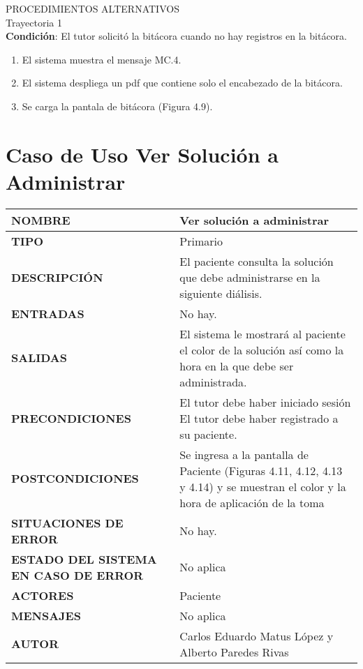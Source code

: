 \newpage
\Large{PROCEDIMIENTOS ALTERNATIVOS}\\
\large{Trayectoria 1}\\
\textbf{Condición}: El tutor solicitó la bitácora cuando no hay registros en la bitácora.
\begin{enumerate}
\item El sistema muestra el mensaje MC.4.
\item El sistema despliega un pdf que contiene solo el encabezado de la bitácora.
\item Se carga la pantala de bitácora (Figura 4.9).
\end{enumerate}
\newpage
\section{Caso de Uso Ver Solución a Administrar}
\begin{longtable}{ | p{6cm} | p{10cm} |}
\hline
      \textbf{NOMBRE} & Ver solución a administrar\\
      \hline
      \textbf{TIPO} & Primario\\
      \hline
      \textbf{DESCRIPCIÓN} & El paciente consulta la solución que debe administrarse en la siguiente diálisis.\\
      \hline
      \textbf{ENTRADAS} & No hay.\\
      \hline
      \textbf{SALIDAS} & El sistema le mostrará al paciente el color de la solución así como la hora en la que debe ser administrada.\\
      \hline
      \textbf{PRECONDICIONES} & El tutor debe haber iniciado sesión \newline El tutor debe haber registrado a su paciente.\\
      \hline
      \textbf{POSTCONDICIONES} & Se ingresa a la pantalla de Paciente (Figuras 4.11, 4.12, 4.13 y 4.14) y se muestran el color y la hora de aplicación de la toma\\
      \hline
      \textbf{SITUACIONES DE ERROR} & No hay.\\
      \hline
      \textbf{ESTADO DEL SISTEMA EN CASO DE ERROR} & No aplica\\
      \hline
      \textbf{ACTORES} & Paciente\\
      \hline
      \textbf{MENSAJES} & No aplica\\
      \hline
      \textbf{AUTOR} & Carlos Eduardo Matus López y Alberto Paredes Rivas \\
	  \hline
\end{longtable}
